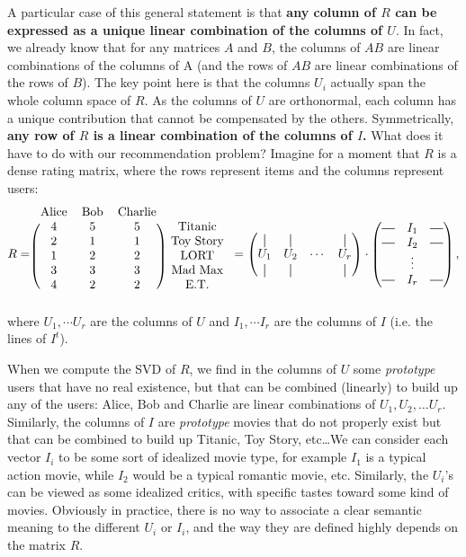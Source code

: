 A particular case of this general statement is that \textbf{any column of $R$
can be expressed as a unique linear combination of the columns of $U$}. In
fact, we already know that for any matrices $A$ and $B$, the columns of $AB$ are
linear combinations of the columns of A (and the rows of $AB$ are linear
combinations of the rows of $B$). The key point here is that the columns $U_i$
actually span the whole column space of $R$. As the
columns of $U$ are orthonormal, each column has a unique contribution that
cannot be compensated by the others. Symmetrically, \textbf{any row of $R$ is a
linear combination of the columns of $I$.} What does it have to do with our
recommendation problem? Imagine for a moment that $R$ is a dense rating matrix,
where the rows represent items and the columns represent users:
$$
R = \begin{blockarray}{cccc}
  \text{Alice} & \text{Bob} & \text{Charlie} \\
\begin{block}{(ccc) c}
  4 & 5 & 5 & \text{Titanic} \\
  2 & 1 & 1 & \text{Toy Story} \\
  1 & 2 & 2 & \text{LORT} \\
  3 & 3 & 3 & \text{Mad Max} \\
  4 & 2 & 2 & \text{E.T.} \\
\end{block}
\end{blockarray}
=
\begin{pmatrix}
  \vertbar & \vertbar & & \vertbar\\
  U_1& U_2 & \cdots & U_r\\
  \vertbar & \vertbar & & \vertbar\\
\end{pmatrix}
\cdot
\begin{pmatrix}
  \horzbar& I_1 & \horzbar\\
  \horzbar& I_2 & \horzbar\\
   & \vdots & \\
  \horzbar& I_r &\horzbar \\
\end{pmatrix}
,
$$
where $U_1, \cdots U_r$ are the columns of $U$ and $I_1, \cdots I_r$ are the
columns of $I$ (i.e. the lines of $I^t$).

When we compute the SVD of $R$, we find in the columns of $U$ some
\textit{prototype} users that have no real existence, but that can be combined
(linearly) to build up any of the users: Alice, Bob and Charlie are linear
combinations of $U_1, U_2, \dots U_r$.  Similarly, the columns of $I$ are
\textit{prototype} movies that do not properly exist but that can be combined
to build up Titanic, Toy Story, etc\dots We can consider each vector $I_i$
to be some sort of idealized movie type, for example $I_1$ is a typical action
movie, while $I_2$ would be a typical romantic movie, etc. Similarly, the
$U_i$'s can be viewed as some idealized critics, with specific tastes toward
some kind of movies. Obviously in practice, there is no way to associate a
clear semantic meaning to the different $U_i$ or $I_i$, and the way they are
defined highly depends on the matrix $R$.

